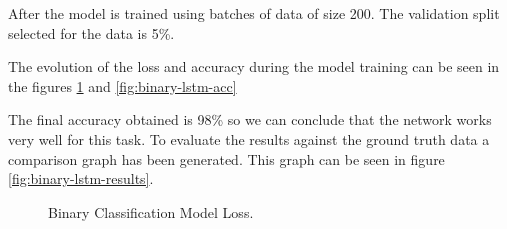 After the model is trained using batches of data of size 200. The validation split selected for the data is 5\%.

The evolution of the loss and accuracy during the model training can be seen in the figures \ref{fig:binary-lstm-loss} and \ref{fig:binary-lstm-acc}

The final accuracy obtained is 98\% so we can conclude that the network works very well for this task. To evaluate the results against the ground truth data a comparison graph has been generated. This graph can be seen in figure \ref{fig:binary-lstm-results}.

\begin{figure}
\begin{center}
\end{center}
\decoRule
\caption[Binary Classification Model Loss]{Binary Classification Model Loss.}
\label{fig:binary-lstm-loss}\end{figure}

